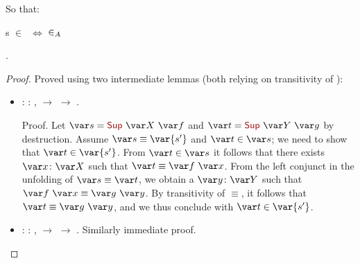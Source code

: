 So that:

s $\in$    $~\Leftrightarrow$  $\in_A$ 

\begin{coqdoccode}
  \coqdocnoindent
{}           .\coqdoceol
\end{coqdoccode}
\begin{proof}
  Proved using two intermediate lemmas (both relying on transitivity of ):
  \begin{itemize}
    \item {}: %
    \coqdockw{\ensuremath{\forall}}    : ,  \EQ {} \ensuremath{\rightarrow}  \IN {} \ensuremath{\rightarrow}  \IN {}.


    Proof. Let $\var s = \coqdocconstructor{Sup}~\var X~\var f$ and $\var t = \coqdocconstructor{Sup}~\var Y~\var g$ by destruction. Assume $\var s \equiv \var{s'}$ and $\var t \in \var s$; we need to show that $\var t \in \var{s'}$. From $\var t \in \var s$ it follows that there exists $\var x\colon \var X$ such that $\var t \equiv \var f~\var x$. From the left conjunct in the unfolding of $\var s \equiv \var t$, we obtain a $\var y\colon \var Y$ such that $\var f~\var x \equiv \var g~\var y$. By transitivity of $\equiv$, it follows that $\var t \equiv \var g~\var y$, and we thus conclude with $\var t \in \var{s'}$.


    \item {}: %
    \coqdockw{\ensuremath{\forall}}    : ,  \EQ {} \ensuremath{\rightarrow}  \IN {} \ensuremath{\rightarrow}  \IN {}. Similarly immediate proof.
    \qedhere
  \end{itemize}
\end{proof}

